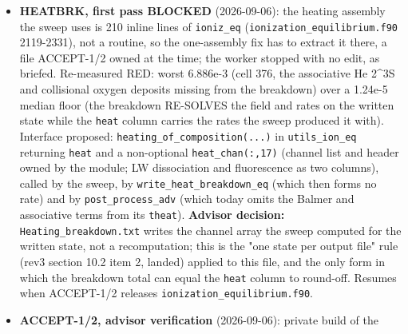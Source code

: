 \documentclass[english,a4paper]{my_memo}
\begin{document}
\begin{itemize}
  cells not yet at the fixed point; tolerance anchored on a measured
  convergence study, not chosen to pass). Also in and byte-identical: the
  carrier status pre-set removal (HYG-B3a) and the two O0FPE sites;
  \texttt{fpe\_traps} passes at -O0 with traps. Left red on purpose:
  \texttt{heat\_column\_matches\_breakdown\_total} 6.886e-3, because
  \texttt{write\_heat\_breakdown\_eq} (\texttt{util\_ion\_eq.f90} 2280) is a second
  hand-maintained copy of the heating assembly that lacks the new deposit,
  and \texttt{post\_process\_adv.f90} \textasciitilde847 a third: assigned as HEATBRK (one
  assembly, three callers), not the ten-line patch. Advisor verification:
  private build of the live tree, \texttt{coupled\_source\_step} 30/0, \texttt{energy\_update}
  48/0, \texttt{attempted\_step} 31/0, \texttt{certification} 29/0, \texttt{run\_mode} 30/0,
  \texttt{acceptance\_classes} 12/0, \texttt{grid\_and\_gates} 92/1 (the HEATBRK red).
\item
  \textbf{HEATBRK, first pass BLOCKED} (2026-09-06): the heating assembly the
  sweep uses is 210 inline lines of \texttt{ioniz\_eq} (\texttt{ionization\_equilibrium.f90}
  2119-2331), not a routine, so the one-assembly fix has to extract it there,
  a file ACCEPT-1/2 owned at the time; the worker stopped with no edit, as
  briefed. Re-measured RED: worst 6.886e-3 (cell 376, the associative He 2\^{}3S
  and collisional oxygen deposits missing from the breakdown) over a 1.24e-5
  median floor (the breakdown RE-SOLVES the field and rates on the written
  state while the \texttt{heat} column carries the rates the sweep produced it
  with). Interface proposed: \texttt{heating\_of\_composition(...)} in \texttt{utils\_ion\_eq}
  returning \texttt{heat} and a non-optional \texttt{heat\_chan(:,17)} (channel list and
  header owned by the module; LW dissociation and fluorescence as two
  columns), called by the sweep, by \texttt{write\_heat\_breakdown\_eq} (which then
  forms no rate) and by \texttt{post\_process\_adv} (which today omits the Balmer and
  associative terms from its \texttt{theat}). \textbf{Advisor decision:}
  \texttt{Heating\_breakdown.txt} writes the channel array the sweep computed for
  the written state, not a recomputation; this is the "one state per output
  file" rule (rev3 section 10.2 item 2, landed) applied to this file, and
  the only form in which the breakdown total can equal the \texttt{heat} column to
  round-off. Resumes when ACCEPT-1/2 releases \texttt{ionization\_equilibrium.f90}.
\item
  \textbf{ACCEPT-1/2, advisor verification} (2026-09-06): private build of the

\end{itemize}
\end{document}
